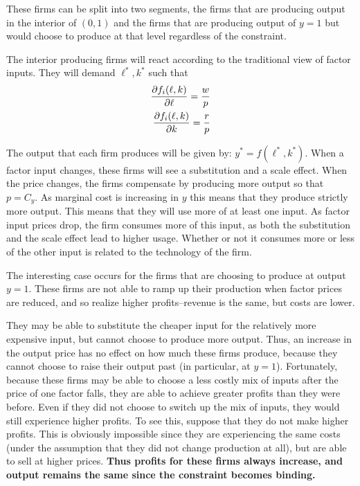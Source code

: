 \documentclass[12pt]{paper}
\begin{document}
These firms can be split into two segments, the firms that are
producing output in the interior of $(0,1)$ and the firms that are
producing output of $y=1$ but would choose to produce at that level
regardless of the constraint.

The interior producing firms will react according to the traditional
view of factor inputs. They will demand $\ell^{*}, k^{*}$ such that
\begin{align*}
  \frac{ \partial f_i(\ell,k)}{ \partial \ell} = \frac{w}{p}\\
  \frac{ \partial f_i(\ell,k)}{ \partial k} = \frac{r}{p}
\end{align*}

The output that each firm produces will be given by:
$y^{*} = f(\ell^{*}, k^{*})$. When a factor input changes, these firms
will see a substitution and a scale effect. When the price changes,
the firms compensate by producing more output so that $p = C_y$. As
marginal cost is increasing in $y$ this means that they produce
strictly more output. This means that they will use more of at least
one input.  As factor input prices drop, the firm consumes more of
this input, as both the substitution and the scale effect lead to
higher usage. Whether or not it consumes more or less of the other input
is related to the technology of the firm.

The interesting case occurs for the firms that are choosing to produce
at output $y = 1$. These firms are not able to ramp up their
production when factor prices are reduced, and so realize higher profits--revenue is the same, but costs are lower.

They may be able to substitute the cheaper input for the relatively more expensive input, but cannot choose to produce more output. Thus, an increase in the output price has no effect on how much these firms produce, because they cannot choose to raise their output past (in particular, at $y=1$). Fortunately, because these firms may be able to choose a less costly mix of inputs after the price of one factor falls, they are able to achieve greater profits than they were before. Even if they did not choose to switch up the mix of inputs, they would still experience higher profits. To see this, suppose that they do not make higher profits. This is obviously impossible since they are experiencing the same costs (under the assumption that they did not change production at all), but are able to sell at higher prices. \textbf{Thus profits for these firms always increase, and output remains the same since the constraint becomes binding.}
\end{document}
